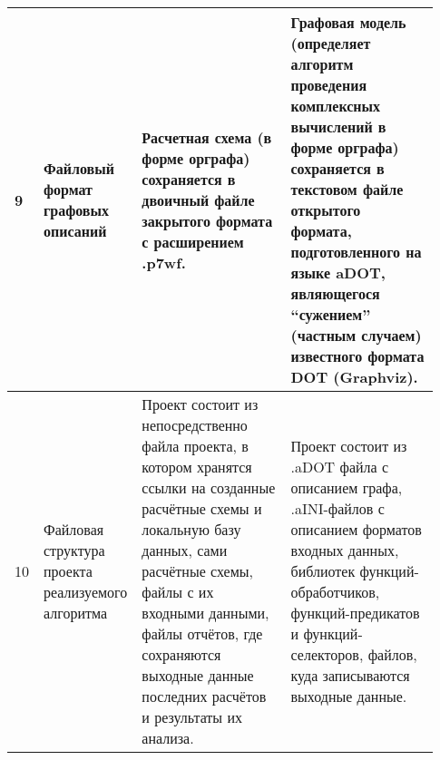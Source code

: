 \begin{landscape}
\begin{longtable}{|p{0.03\linewidth}|p{0.2\linewidth}|p{0.35\linewidth}|p{0.35\linewidth}|}
        \hline
        9          & Файловый формат графовых описаний                                                          & Расчетная схема (в форме орграфа) сохраняется в двоичный файле закрытого формата с расширением \textsf{.p7wf}.                                                                                                                                                                                                                                                                                                                                                                                                                                                                                                                                                    & Графовая модель (определяет алгоритм проведения комплексных вычислений в форме орграфа) сохраняется в текстовом файле открытого формата, подготовленного на языке \gls{aDOT}\cite{SokolovADOT2020}, являющегося ``сужением'' (частным случаем) известного формата DOT (Graphviz). \\
        \hline
        10         & Файловая структура проекта реализуемого алгоритма                                          & Проект состоит из непосредственно файла проекта, в котором хранятся ссылки на созданные расчётные схемы и локальную базу данных, сами расчётные схемы, файлы с их входными данными, файлы отчётов, где сохраняются выходные данные последних расчётов и результаты их анализа.                                                                                                                                                                                                                                                                                                                                                                                    & Проект состоит из \textsf{.aDOT} файла с описанием графа, \textsf{.aINI}-файлов с описанием форматов входных данных, библиотек функций-обработчиков, функций-предикатов и функций-селекторов, файлов, куда записываются выходные данные.                                          \\
        \hline

\end{longtable}
\end{landscape}
